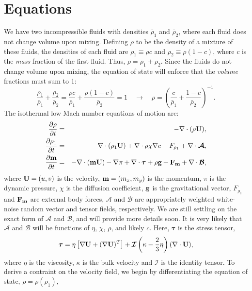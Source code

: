 \documentclass[final]{siamltex}
\def\Fb {{\bf F}}
\def\gb {{\bf g}}
\def\mb {{\bf m}}
\def\Ub {{\bf U}}
\def\bA {\bm{\mathcal{A}}}
\def\bB {\bm{\mathcal{B}}}
\def\bI {\bm{\mathcal{I}}}
\def\taub {\boldsymbol{\tau}}
\begin{document}
\section{Equations}
We have two incompressible fluids with densities $\bar\rho_1$ and $\bar\rho_2$, where each fluid does not 
change volume upon mixing.  Defining $\rho$ to be the density of a mixture of these fluids, the densities of
each fluid are $\rho_1 \equiv \rho c$ and $\rho_2 \equiv \rho(1-c)$, where $c$ is the {\it mass} fraction of the 
first fluid.  Thus, $\rho = \rho_1 + \rho_2$.  Since the fluids do not change volume upon mixing, the equation 
of state will enforce that the {\it volume} fractions must sum to 1:
\begin{equation}
\frac{\rho_1}{\bar\rho_1} + \frac{\rho_2}{\bar\rho_2} =
\frac{\rho c}{\bar\rho_1} + \frac{\rho(1-c)}{\bar\rho_2} = 1 
\quad \rightarrow \quad
\rho = \left(\frac{c}{\bar\rho_1} + \frac{1-c}{\bar\rho_2}\right)^{-1}.
\end{equation}
The isothermal low Mach number equations of motion are:
\begin{eqnarray}
\frac{\partial\rho}{\partial t} &=& -\nabla\cdot(\rho\Ub),\label{eq:rho}\\
\frac{\partial\rho_1}{\partial t} &=& -\nabla\cdot(\rho_1\Ub) + \nabla\cdot\rho\chi\nabla c + F_{\rho_1} + \nabla\cdot\bA,\label{eq:rho1}\\
\frac{\partial\mb}{\partial t} &=& -\nabla\cdot(\mb\Ub) - \nabla\pi + \nabla\cdot\taub + \rho\gb + \Fb_{\mb} + \nabla\cdot\bB,\label{eq:m}
\end{eqnarray}
where $\Ub=(u,v)$ is the velocity, $\mb=(m_x,m_y)$ is the momentum, $\pi$ is the dynamic pressure, $\chi$ is the 
diffusion coefficient, $\gb$ is the gravitational vector, $F_{\rho_1}$ and $\Fb_{\mb}$ are external body forces, $\bA$ and $\bB$ are appropriately weighted white-noise
random vector and tensor fields, respectively.  We are still settling on the exact form of $\bA$ and $\bB$,
and will provide more details soon.  It is very likely that $\bA$ and $\bB$ will be functions of 
$\eta$, $\chi$, $\rho$, and likely $c$.  Here, $\taub$ is the stress tensor,
\begin{equation}
\taub = \eta\left[\nabla\Ub + (\nabla\Ub)^T\right] + \bI\left(\kappa-\frac{2}{3}\eta\right)(\nabla\cdot\Ub),\label{eq:stress tensor}
\end{equation}
where $\eta$ is the viscosity, $\kappa$ is the bulk velocity and $\bI$ is the identity tensor.
To derive a contraint on the velocity field, we begin by differentiating the equation of state, $\rho=\rho(\rho_1)$,
\end{document}
